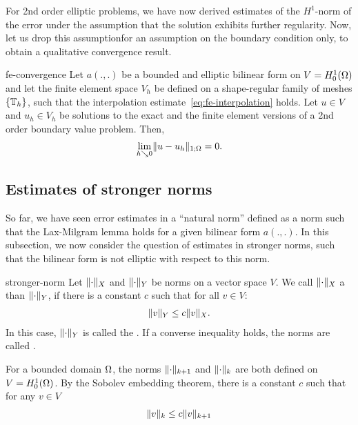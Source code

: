 \begin{intro}
  For 2nd order elliptic problems, we have now derived estimates of
  the $H^1$-norm of the error under the assumption that the solution
  exhibits further regularity. Now, let us drop this assumptionfor an
  assumption on the boundary condition only, to obtain a qualitative
  convergence result.
\end{intro}

\begin{Theorem}{fe-convergence}
  Let $a(.,.)$ be a bounded and elliptic bilinear form on
  $V = H^1_0(\Omega)$ and let the finite element space $V_h$ be
  defined on a shape-regular family of meshes $\{\mathbb T_h\}$, such that
  the interpolation estimate~\cref{eq:fe-interpolation} holds. Let
  $u\in V$ and $u_h\in V_h$ be solutions to the exact and the finite
  element versions of a 2nd order boundary value problem. Then,
  \begin{gather}
    \lim_{h\searrow 0} \lVert u-u_h\rVert_{1;\Omega} = 0.
  \end{gather}
\end{Theorem}

\subsection{Estimates of stronger norms}

\begin{intro}
  So far, we have seen error estimates in a ``natural norm'' defined
  as a norm such that the Lax-Milgram lemma holds for a given bilinear
  form $a(.,.)$. In this subsection, we now consider the question of
  estimates in stronger norms, such that the bilinear form is not
  elliptic with respect to this norm.
\end{intro}

\begin{Definition}{stronger-norm}
  Let $\lVert\cdot\rVert_X$ and $\lVert\cdot\rVert_Y$ be norms on a vector space
  $V$. We call $\lVert\cdot\rVert_X$ a  than
  $\lVert\cdot\rVert_Y$, if there is a constant $c$ such that for all
  $v\in V$:
  \begin{gather}
    \lVert v\rVert_Y \le c \lVert v\rVert_X.
  \end{gather}
  In this case, $\lVert\cdot\rVert_Y$ is called the . If a converse inequality holds, the norms are called
  .
\end{Definition}

\begin{example}
  For a bounded domain $\Omega$, the norms $\lVert\cdot\rVert_{k+1}$ and
  $\lVert\cdot\rVert_{k}$ are both defined on $V = H^1_0(\Omega)$. By the
  Sobolev embedding theorem, there is a constant $c$ such that for any
  $v\in V$
  \begin{gather*}
    \lVert v\rVert_{k} \le c \lVert v\rVert_{k+1}
  \end{gather*}
\end{example}

